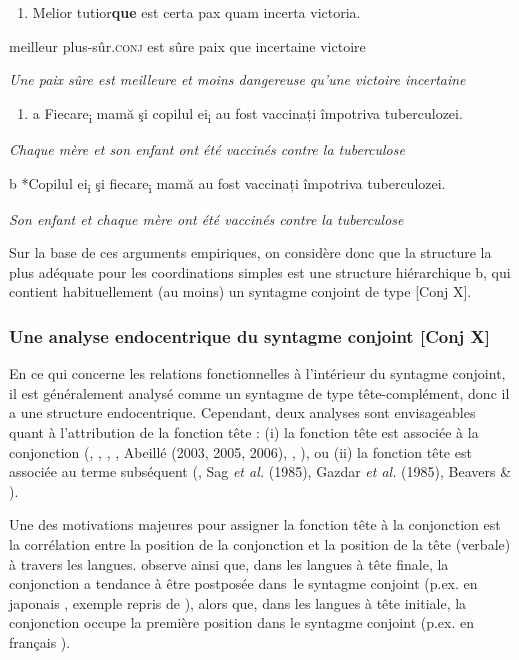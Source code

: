\begin{enumerate}
\item \label{bkm:Ref301778499}Melior  tutior\textbf{que}  est  certa  pax  quam  incerta  victoria. 


\end{enumerate}
  meilleur  plus-sûr.\textsc{conj}  est  sûre  paix  que  incertaine  victoire

{\itshape
  Une paix sûre est meilleure et moins dangereuse qu'une victoire incertaine} 


\begin{enumerate}
\item \label{bkm:Ref301779023}a  Fiecare\textsubscript{i} mamă şi copilul ei\textsubscript{i} au fost vaccinați împotriva tuberculozei.


\end{enumerate}
{\itshape
Chaque mère et son enfant ont été vaccinés contre la tuberculose}

  b  *Copilul ei\textsubscript{i} şi fiecare\textsubscript{i} mamă au fost vaccinați împotriva tuberculozei.

{\itshape
Son enfant et chaque mère ont été vaccinés contre la tuberculose}

Sur la base de ces arguments empiriques, on considère donc que la structure la plus adéquate pour les coordinations simples est une structure hiérarchique b, qui contient habituellement (au moins) un syntagme conjoint de type [Conj X].

\subsubsection{Une analyse endocentrique du syntagme conjoint [Conj X]}
\label{bkm:Ref301808307}\label{bkm:Ref301808905}En ce qui concerne les relations fonctionnelles à l'intérieur du syntagme conjoint, il est généralement analysé comme un syntagme de type tête-complément, donc il a une structure endocentrique. Cependant, deux analyses sont envisageables quant à l'attribution de la fonction tête : (i) la fonction tête est associée à la conjonction (\citet{Paritong1992}, \citet{Munn1993}, \citet{Kayne1994}, \citet{Johannessen1998}, Abeillé (2003, 2005, 2006), \citet{Skrabalova2004}, \citet{Mouret2007}), ou (ii) la fonction tête est associée au terme subséquent (\citet{Ross1967}, Sag \textit{et al.} (1985), Gazdar \textit{et al.} (1985), Beavers \& \citet{Sag2004}).  

Une des motivations majeures pour assigner la fonction tête à la conjonction est la corrélation entre la position de la conjonction et la position de la tête (verbale) à travers les langues. \citet{Kayne1994} observe ainsi que, dans les langues à tête finale, la conjonction a tendance à être postposée dans~le syntagme conjoint (p.ex. en japonais , exemple repris de \citet[69]{Mouret2007}), alors que, dans les langues à tête initiale, la conjonction occupe la première position dans le syntagme conjoint (p.ex. en français ).


